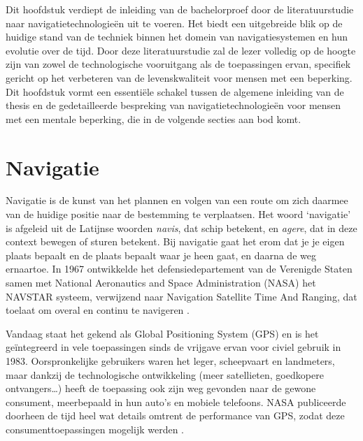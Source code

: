 


Dit hoofdstuk verdiept de inleiding van de bachelorproef door de literatuurstudie naar navigatietechnologieën uit te voeren. Het biedt een uitgebreide blik op de huidige stand van de techniek binnen het domein van navigatiesystemen en hun evolutie over de tijd. Door deze literatuurstudie zal de lezer volledig op de hoogte zijn van zowel de technologische vooruitgang als de toepassingen ervan, specifiek gericht op het verbeteren van de levenskwaliteit voor mensen met een beperking. Dit hoofdstuk vormt een essentiële schakel tussen de algemene inleiding van de thesis en de gedetailleerde bespreking van navigatietechnologieën voor mensen met een mentale beperking, die in de volgende secties aan bod komt.
\section{Navigatie}
\label{sec:navigatie}

Navigatie is de kunst van het plannen en volgen van een route om zich daarmee van de huidige positie naar de bestemming te verplaatsen. Het woord `navigatie' is afgeleid uit de Latijnse woorden \textit{navis}, dat schip betekent, en \textit{agere}, dat in deze context bewegen of sturen betekent. Bij navigatie gaat het erom dat je je eigen plaats bepaalt en de plaats bepaalt waar je heen gaat, en daarna de weg ernaartoe. 
In 1967 ontwikkelde het defensiedepartement van de Verenigde Staten samen met National Aeronautics and Space Administration (NASA) het NAVSTAR systeem, verwijzend naar Navigation Satellite Time And Ranging, dat toelaat om overal en continu te navigeren \autocite{Bowditch2002}. 

Vandaag staat het gekend als Global Positioning System (GPS) en is het geïntegreerd in vele toepassingen sinds de vrijgave ervan voor civiel gebruik in 1983. Oorspronkelijke gebruikers waren het leger, scheepvaart en landmeters, maar dankzij de technologische ontwikkeling (meer satellieten, goedkopere ontvangers\ldots) heeft de toepassing ook zijn weg gevonden naar de gewone consument, meerbepaald in hun auto's en mobiele telefoons. NASA publiceerde doorheen de tijd heel wat details omtrent de performance van GPS, zodat deze consumenttoepassingen mogelijk werden \autocite{Zaidman2008}.

